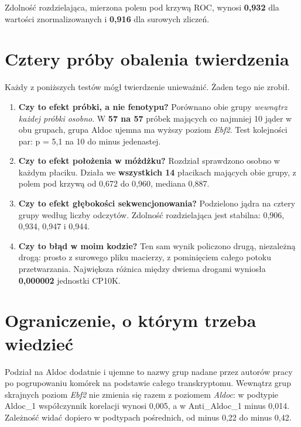 \documentclass[a4paper,11pt]{report}
\begin{document}
Zdolność rozdzielająca, mierzona polem pod krzywą ROC, wynosi \textbf{0,932}
dla wartości znormalizowanych i \textbf{0,916} dla surowych zliczeń.

\section{Cztery próby obalenia twierdzenia}

Każdy z poniższych testów mógł twierdzenie unieważnić. Żaden tego nie zrobił.

\begin{enumerate}
    \item \textbf{Czy to efekt próbki, a nie fenotypu?} Porównano obie grupy
    \textit{wewnątrz każdej próbki osobno}. W \textbf{57 na 57} próbek mających
    co najmniej 10 jąder w obu grupach, grupa Aldoc ujemna ma wyższy poziom
    \textit{Ebf2}. Test kolejności par: p = 5,1 na 10 do minus jedenastej.

    \item \textbf{Czy to efekt położenia w móżdżku?} Rozdział sprawdzono osobno
    w każdym płaciku. Działa we \textbf{wszystkich 14} płacikach mających obie
    grupy, z polem pod krzywą od 0,672 do 0,960, mediana 0,887.

    \item \textbf{Czy to efekt głębokości sekwencjonowania?} Podzielono jądra na
    cztery grupy według liczby odczytów. Zdolność rozdzielająca jest stabilna:
    0,906, 0,934, 0,947 i 0,944.

    \item \textbf{Czy to błąd w moim kodzie?} Ten sam wynik policzono drugą,
    niezależną drogą: prosto z surowego pliku macierzy, z pominięciem całego
    potoku przetwarzania. Największa różnica między dwiema drogami wyniosła
    \textbf{0,000002} jednostki CP10K.
\end{enumerate}

\section{Ograniczenie, o którym trzeba wiedzieć}

Podział na Aldoc dodatnie i ujemne to nazwy grup nadane przez autorów pracy po
pogrupowaniu komórek na podstawie całego transkryptomu. Wewnątrz grup skrajnych
poziom \textit{Ebf2} nie zmienia się razem z poziomem \textit{Aldoc}: w podtypie
Aldoc\_1 współczynnik korelacji wynosi 0,005, a w Anti\_Aldoc\_1 minus 0,014.
Zależność widać dopiero w podtypach pośrednich, od minus 0,22 do minus 0,42.
\end{document}
